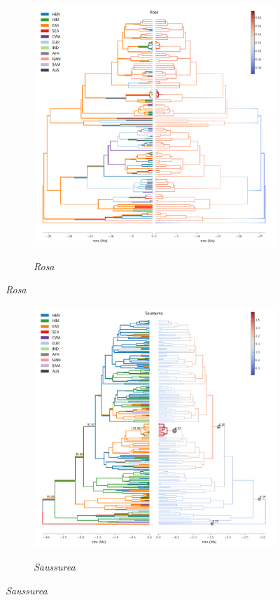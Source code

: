 \begin{figure}
  \ContinuedFloat
\begin{subfigure}{\textwidth}
\centering
\includegraphics[width=.99\linewidth]{figures/Rosa-supfig.pdf}
\label{fig:allium}
\caption{\textit{Rosa}}
\end{subfigure}
\end{figure}

\begin{figure}
  \ContinuedFloat
\begin{subfigure}{\textwidth}
\centering
\includegraphics[width=.99\linewidth]{figures/Saussurea-supfig.pdf}
\label{fig:allium}
\caption{\textit{Saussurea}}
\end{subfigure}
\end{figure}

